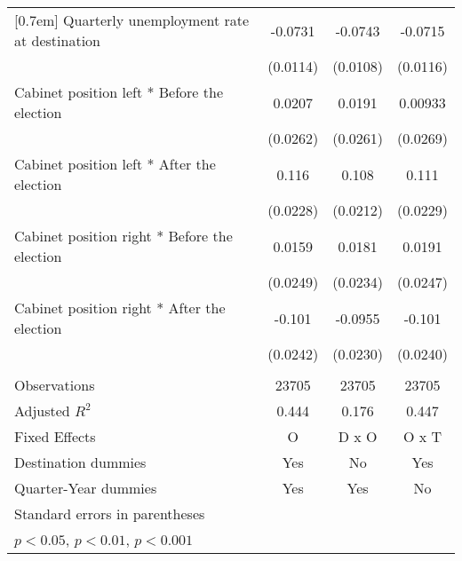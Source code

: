 \begin{table}[htbp]
\begin{tabular}{l*{3}{c}}
[0.7em]
Quarterly unemployment rate at destination&     -0.0731\sym{***}&     -0.0743\sym{***}&     -0.0715\sym{***}\\
                    &    (0.0114)         &    (0.0108)         &    (0.0116)         \\
[0.7em]
Cabinet position left * Before the election&      0.0207         &      0.0191         &     0.00933         \\
                    &    (0.0262)         &    (0.0261)         &    (0.0269)         \\
[0.7em]
Cabinet position left * After the election&       0.116\sym{***}&       0.108\sym{***}&       0.111\sym{***}\\
                    &    (0.0228)         &    (0.0212)         &    (0.0229)         \\
[0.7em]
Cabinet position right * Before the election&      0.0159         &      0.0181         &      0.0191         \\
                    &    (0.0249)         &    (0.0234)         &    (0.0247)         \\
[0.7em]
Cabinet position right * After the election&      -0.101\sym{***}&     -0.0955\sym{***}&      -0.101\sym{***}\\
                    &    (0.0242)         &    (0.0230)         &    (0.0240)         \\
& \\
\hline
Observations        &       23705         &       23705         &       23705         \\
Adjusted \(R^{2}\)  &       0.444         &       0.176         &       0.447         \\
Fixed Effects       &           O         &       D x O         &       O x T         \\
Destination dummies &         Yes         &          No         &         Yes         \\
Quarter-Year dummies&         Yes         &         Yes         &          No         \\
\hline\hline
\multicolumn{4}{l}{\footnotesize Standard errors in parentheses}\\
\multicolumn{4}{l}{\footnotesize \sym{*} \(p<0.05\), \sym{**} \(p<0.01\), \sym{***} \(p<0.001\)}\\
\end{tabular}
\end{table}
